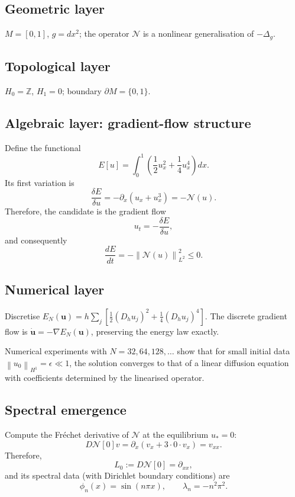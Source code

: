 \documentclass[11pt,a4paper]{article}
\theoremstyle{definition}
\theoremstyle{plain}
\newcommand{\Ncal}{\mathcal{N}}
\newcommand{\Norm}[1]{\left\lVert #1 \right\rVert}
\newcommand{\Z}{\mathbb{Z}}
\begin{document}
\subsection{Geometric layer}

$M = [0,1]$, $g = dx^2$; the operator $\Ncal$ is a nonlinear
generalisation of $-\Delta_g$.

\subsection{Topological layer}

$H_0 = \Z$, $H_1 = 0$; boundary $\partial M = \{0, 1\}$.

\subsection{Algebraic layer: gradient-flow structure}

Define the functional
\[
  E[u] = \int_0^1 \left( \frac{1}{2} u_x^2 + \frac{1}{4} u_x^4 \right) dx.
\]
Its first variation is
\[
  \frac{\delta E}{\delta u}
  =
  -\partial_x(u_x + u_x^3)
  =
  -\Ncal(u).
\]
Therefore, the candidate is the gradient flow
\[
  u_t = -\frac{\delta E}{\delta u},
\]
and consequently
\[
  \frac{dE}{dt} = -\Norm{\Ncal(u)}_{L^2}^2 \leq 0.
\]

\subsection{Numerical layer}

Discretise $E_N(\mathbf u) = h \sum_j [\frac{1}{2}(D_h u_j)^2 +
\frac{1}{4}(D_h u_j)^4]$. The discrete gradient flow is
$\dot{\mathbf u} = -\nabla E_N(\mathbf u)$, preserving the energy
law exactly.

Numerical experiments with $N = 32, 64, 128, \ldots$ show that for
small initial data $\Norm{u_0}_{H^1} = \epsilon \ll 1$, the
solution converges to that of a linear diffusion equation with
coefficients determined by the linearised operator.

\subsection{Spectral emergence}

Compute the Fr\'echet derivative of $\Ncal$ at the equilibrium
$u_\ast = 0$:
\[
  D\Ncal[0] v
  =
  \partial_x(v_x + 3 \cdot 0 \cdot v_x)
  =
  v_{xx}.
\]
Therefore,
\[
  L_0 := D\Ncal[0] = \partial_{xx},
\]
and its spectral data (with Dirichlet boundary conditions) are
\[
  \phi_n(x) = \sin(n \pi x), \qquad \lambda_n = -n^2 \pi^2.
\]
\end{document}
